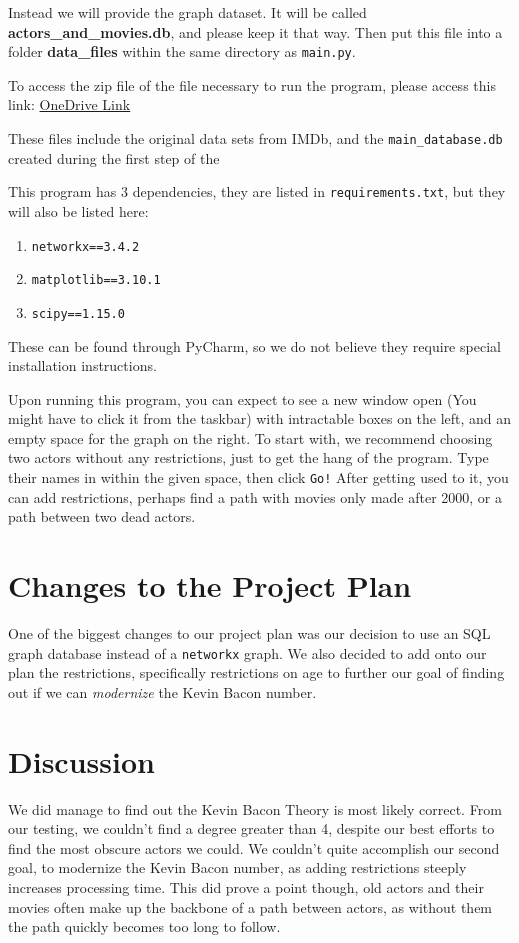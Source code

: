 \documentclass{article}
\begin{document}
Instead we will provide the graph dataset. It will be called \textbf{actors\_and\_movies.db}, and please keep it that way. Then put this file into a folder \textbf{data\_files} within the same directory as \verb!main.py!.

To access the zip file of the file necessary to run the program, please access this link: \href{https://utoronto-my.sharepoint.com/:u:/g/personal/nabhan_rashid_mail_utoronto_ca/EYMbuqB8-ARIrHxDK7YhbWkBS4cH6Imba-6myQPnr1z57w?e=JQY8F9}{OneDrive Link}

These files include the original data sets from IMDb, and the \verb!main_database.db! created during the first step of the 

This program has 3 dependencies, they are listed in \verb!requirements.txt!, but they will also be listed here:
\begin{enumerate}
\item \verb!networkx==3.4.2!
\item \verb!matplotlib==3.10.1!
\item \verb!scipy==1.15.0!
\end{enumerate}
These can be found through PyCharm, so we do not believe they require special installation instructions.

Upon running this program, you can expect to see a new window open (You might have to click it from the taskbar) with intractable boxes on the left, and an empty space for the graph on the right. To start with, we recommend choosing two actors without any restrictions, just to get the hang of the program. Type their names in within the given space, then click \verb+Go!+ After getting used to it, you can add restrictions, perhaps find a path with movies only made after 2000, or a path between two dead actors.

\section{Changes to the Project Plan}
One of the biggest changes to our project plan was our decision to use an SQL graph database instead of a \verb!networkx! graph. We also decided to add onto our plan the restrictions, specifically restrictions on age to further our goal of finding out if we can \emph{modernize} the Kevin Bacon number.

\section{Discussion}
We did manage to find out the Kevin Bacon Theory is most likely correct. From our testing, we couldn't find a degree greater than 4, despite our best efforts to find the most obscure actors we could. We couldn't quite accomplish our second goal, to modernize the Kevin Bacon number, as adding restrictions steeply increases processing time. This did prove a point though, old actors and their movies often make up the backbone of a path between actors, as without them the path quickly becomes too long to follow.
\end{document}
